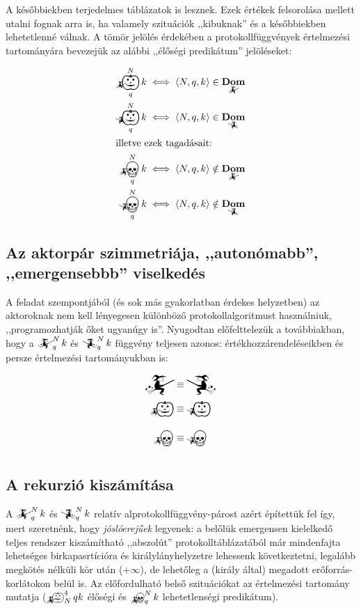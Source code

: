 \documentclass{article}
\DeclareMathOperator{\dom}{\mathbf{Dom}}
\newcommand{\angled}[1]{\left\langle#1\right\rangle}
\newcommand{\mainfunA}[3]{\mathwitch_{#2}^{#1}#3}
\newcommand{\mainfunB}[3]{\reversemathwitch_{#2}^{#1}#3}
\newcommand{\nomainfunA}[3]{{}_{\mathwitch}\!\!\!\!\bigskull^{#1}_{#2}#3}
\newcommand{\nomainfunB}[3]{{}_{\reversemathwitch}\!\!\!\!\bigskull^{#1}_{#2}#3}
\newcommand{\yesmainfunA}[3]{{}_{\mathwitch}\!\!\!\!\bigpumpkin^{#1}_{#2}#3}
\newcommand{\yesmainfunB}[3]{{}_{\reversemathwitch}\!\!\!\!\bigpumpkin^{#1}_{#2}#3}
\newcommand{\currymainfunA}{\mathwitch}
\newcommand{\currymainfunB}{\reversemathwitch}
\begin{document}
	A későbbiekben terjedelmes táblázatok is lesznek. Ezek értékek felsorolása mellett utalni fognak arra is, ha valamely szituációk ,,kibuknak'' és a későbbiekben lehetetlenné válnak. A tömör jelölés érdekében a protokollfüggvények értelmezési tartományára bevezejük az alábbi ,,élőségi predikátum'' jelöléseket:

	\begin{align}
		\yesmainfunA Nqk &\iff \angled{N,q,k}\in\dom_{\mathwitch} \\
		\yesmainfunB Nqk &\iff \angled{N,q,k}\in\dom_{\reversemathwitch} \\\intertext{illetve ezek tagadásait:}
		\nomainfunA  Nqk &\iff \angled{N,q,k}\notin\dom_{\mathwitch} \\
		\nomainfunB  Nqk &\iff \angled{N,q,k}\notin\dom_{\reversemathwitch}
	\end{align}

	\subsection{Az aktorpár szimmetriája, ,,autonómabb'', ,,emergensebbb'' viselkedés}

	A feladat szempontjából (és sok más gyakorlatban érdekes helyzetben) az aktoroknak nem kell lényegesen különböző protokollalgoritmust használniuk, ,,programozhatják őket ugyanúgy is''.
	Nyugodtan előfelttelezük a továbbiakban, hogy a  $\mainfunA Nqk$ és $\mainfunB Nqk$ függvény teljesen azonos: értékhozzárendeléseikben és persze értelmezési tartományukban is:

	\begin{align}
		\currymainfunA     &\equiv \currymainfunB     \\
		\yesmainfunA{}{}{} &\equiv \yesmainfunB{}{}{} \\
		\nomainfunA{}{}{}  &\equiv \nomainfunB{}{}{}
	\end{align}



	\subsection{A rekurzió kiszámítása}

	A $\mainfunA Nqk$ és $\mainfunB Nqk$ relatív alprotokollfüggvény-párost azért építettük fel így, mert szeretnénk, hogy \emph{jóslóerejűek} legyenek: a belőlük emergensen kielelkedő teljes rendszer kiszámítható ,,abszolút'' protokolltáblázatából már mindenfajta lehetséges birkapasrtícióra és királylányhelyzetre lehessenk következtetni, legalább megkötés nélküli kör után ($+\infty$), de lehetőleg a (király által) megadott erőforrás-korlátokon belül is. Az előfordulható belső szituációkat az értelmezési tartomány mutatja ($\yesmainfunA4 Nqk$ élőségi és $\nomainfunA Nqk$ lehetetlenségi predikátum).
\end{document}
